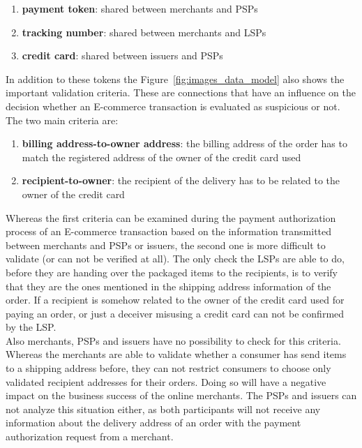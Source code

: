 \begin{enumerate}
  \item \textbf{payment token}: shared between merchants and \gls{PSP}s
  \item \textbf{tracking number}: shared between merchants and \gls{LSP}s
  \item \textbf{credit card}: shared between issuers and \gls{PSP}s
\end{enumerate}

In addition to these tokens the Figure~\ref{fig:images_data_model} also shows the important validation criteria. These are connections that have an influence on the decision whether an \gls{E-commerce} transaction is evaluated as suspicious or not. The two main criteria are: \@

\begin{enumerate}
  \item \textbf{billing address-to-owner address}: the billing address of the order has to match the registered address of the owner of the credit card used
  \item \textbf{recipient-to-owner}: the recipient of the delivery has to be related to the owner of the credit card
\end{enumerate}


Whereas the first criteria can be examined during the payment authorization process of an \gls{E-commerce} transaction based on the information transmitted between merchants and \gls{PSP}s or issuers, the second one is more difficult to validate (or can not be verified at all). The only check the \gls{LSP}s are able to do, before they are handing over the packaged items to the recipients, is to verify that they are the ones mentioned in the shipping address information of the order. If a recipient is somehow related to the owner of the credit card used for paying an order, or just a deceiver misusing a credit card can not be confirmed by the \gls{LSP}. \\

Also merchants, \gls{PSP}s and issuers have no possibility to check for this criteria. Whereas the merchants are able to validate whether a consumer has send items to a shipping address before, they can not restrict consumers to choose only validated recipient addresses for their orders. Doing so will have a negative impact on the business success of the online merchants. The \gls{PSP}s and issuers can not analyze this situation either, as both participants will not receive any information about the delivery address of an order with the payment authorization request from a merchant. \\

